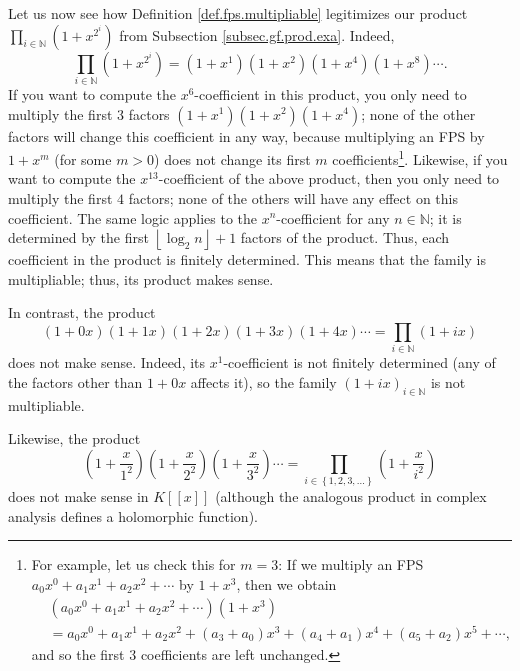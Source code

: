 Let us now see how Definition \ref{def.fps.multipliable} legitimizes our
product $\prod_{i\in\mathbb{N}}\left(  1+x^{2^{i}}\right)  $ from Subsection
\ref{subsec.gf.prod.exa}. Indeed,%
\[
\prod_{i\in\mathbb{N}}\left(  1+x^{2^{i}}\right)  =\left(  1+x^{1}\right)
\left(  1+x^{2}\right)  \left(  1+x^{4}\right)  \left(  1+x^{8}\right)
\cdots.
\]
If you want to compute the $x^{6}$-coefficient in this product, you only need
to multiply the first 3 factors $\left(  1+x^{1}\right)  \left(
1+x^{2}\right)  \left(  1+x^{4}\right)  $; none of the other factors will
change this coefficient in any way, because multiplying an FPS by $1+x^{m}$
(for some $m>0$) does not change its first $m$ coefficients\footnote{For
example, let us check this for $m=3$: If we multiply an FPS $a_{0}x^{0}%
+a_{1}x^{1}+a_{2}x^{2}+\cdots$ by $1+x^{3}$, then we obtain%
\begin{align*}
&  \left(  a_{0}x^{0}+a_{1}x^{1}+a_{2}x^{2}+\cdots\right)  \left(
1+x^{3}\right) \\
&  =a_{0}x^{0}+a_{1}x^{1}+a_{2}x^{2}+\left(  a_{3}+a_{0}\right)  x^{3}+\left(
a_{4}+a_{1}\right)  x^{4}+\left(  a_{5}+a_{2}\right)  x^{5}+\cdots,
\end{align*}
and so the first $3$ coefficients are left unchanged.}. Likewise, if you want
to compute the $x^{13}$-coefficient of the above product, then you only need
to multiply the first $4$ factors; none of the others will have any effect on
this coefficient. The same logic applies to the $x^{n}$-coefficient for any
$n\in\mathbb{N}$; it is determined by the first $\left\lfloor \log
_{2}n\right\rfloor +1$ factors of the product. Thus, each coefficient in the
product is finitely determined. This means that the family is multipliable;
thus, its product makes sense.

In contrast, the product%
\[
\left(  1+0x\right)  \left(  1+1x\right)  \left(  1+2x\right)  \left(
1+3x\right)  \left(  1+4x\right)  \cdots=\prod_{i\in\mathbb{N}}\left(
1+ix\right)
\]
does not make sense. Indeed, its $x^{1}$-coefficient is not finitely
determined (any of the factors other than $1+0x$ affects it), so the family
$\left(  1+ix\right)  _{i\in\mathbb{N}}$ is not multipliable.

Likewise, the product%
\[
\left(  1+\dfrac{x}{1^{2}}\right)  \left(  1+\dfrac{x}{2^{2}}\right)  \left(
1+\dfrac{x}{3^{2}}\right)  \cdots=\prod_{i\in\left\{  1,2,3,\ldots\right\}
}\left(  1+\dfrac{x}{i^{2}}\right)
\]
does not make sense in $K\left[  \left[  x\right]  \right]  $ (although the
analogous product in complex analysis defines a holomorphic function).

